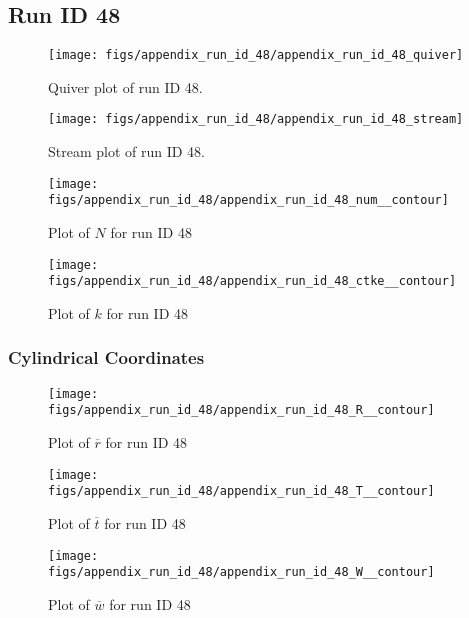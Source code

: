 \subsection{Run ID 48}
\begin{figure}[H]
\centering
\texttt{[image: figs/appendix\_run\_id\_48/appendix\_run\_id\_48\_quiver]}
\caption{Quiver plot of run ID 48.}
\label{fig:appendix_run_id_48_quiver}
\end{figure}


\begin{figure}[H]
\centering
\texttt{[image: figs/appendix\_run\_id\_48/appendix\_run\_id\_48\_stream]}
\caption{Stream plot of run ID 48.}
\label{fig:appendix_run_id_48_stream}
\end{figure}


\begin{figure}[H]
\centering
\texttt{[image: figs/appendix\_run\_id\_48/appendix\_run\_id\_48\_num\_\_contour]}
\caption{Plot of $N$ for run ID 48}
\label{fig:appendix_run_id_48_num__contour}
\end{figure}


\begin{figure}[H]
\centering
\texttt{[image: figs/appendix\_run\_id\_48/appendix\_run\_id\_48\_ctke\_\_contour]}
\caption{Plot of $k$ for run ID 48}
\label{fig:appendix_run_id_48_ctke__contour}
\end{figure}


\subsubsection{Cylindrical Coordinates}
\begin{figure}[H]
\centering
\texttt{[image: figs/appendix\_run\_id\_48/appendix\_run\_id\_48\_R\_\_contour]}
\caption{Plot of $\overline{r}$ for run ID 48}
\label{fig:appendix_run_id_48_R__contour}
\end{figure}


\begin{figure}[H]
\centering
\texttt{[image: figs/appendix\_run\_id\_48/appendix\_run\_id\_48\_T\_\_contour]}
\caption{Plot of $\overline{t}$ for run ID 48}
\label{fig:appendix_run_id_48_T__contour}
\end{figure}


\begin{figure}[H]
\centering
\texttt{[image: figs/appendix\_run\_id\_48/appendix\_run\_id\_48\_W\_\_contour]}
\caption{Plot of $\overline{w}$ for run ID 48}
\label{fig:appendix_run_id_48_W__contour}
\end{figure}


